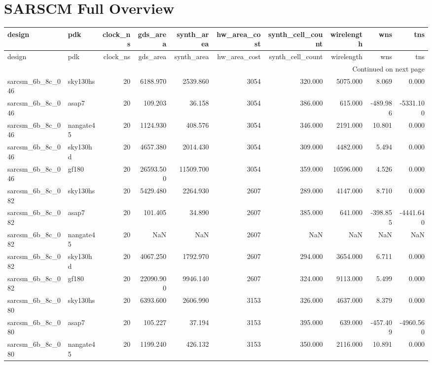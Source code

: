 \documentclass{article}
\begin{document}
\section*{SARSCM Full Overview}
\begin{longtable}{llrrrrrrrr}
\toprule
design & pdk & clock\_ns & gds\_area & synth\_area & hw\_area\_cost & synth\_cell\_count & wirelength & wns & tns \\
\midrule
\endfirsthead
\toprule
design & pdk & clock\_ns & gds\_area & synth\_area & hw\_area\_cost & synth\_cell\_count & wirelength & wns & tns \\
\midrule
\endhead
\midrule
\multicolumn{10}{r}{Continued on next page} \\
\midrule
\endfoot
\bottomrule
\endlastfoot
sarcsm\_6b\_8c\_046 & sky130hs & 20 & 6188.970 & 2539.860 & 3054 & 320.000 & 5075.000 & 8.069 & 0.000 \\
sarcsm\_6b\_8c\_046 & asap7 & 20 & 109.203 & 36.158 & 3054 & 386.000 & 615.000 & -489.986 & -5331.100 \\
sarcsm\_6b\_8c\_046 & nangate45 & 20 & 1124.930 & 408.576 & 3054 & 346.000 & 2191.000 & 10.801 & 0.000 \\
sarcsm\_6b\_8c\_046 & sky130hd & 20 & 4657.380 & 2014.430 & 3054 & 309.000 & 4482.000 & 5.494 & 0.000 \\
sarcsm\_6b\_8c\_046 & gf180 & 20 & 26593.500 & 11509.700 & 3054 & 359.000 & 10596.000 & 4.526 & 0.000 \\
sarcsm\_6b\_8c\_082 & sky130hs & 20 & 5429.480 & 2264.930 & 2607 & 289.000 & 4147.000 & 8.710 & 0.000 \\
sarcsm\_6b\_8c\_082 & asap7 & 20 & 101.405 & 34.890 & 2607 & 385.000 & 641.000 & -398.855 & -4441.640 \\
sarcsm\_6b\_8c\_082 & nangate45 & 20 & NaN & NaN & 2607 & NaN & NaN & NaN & NaN \\
sarcsm\_6b\_8c\_082 & sky130hd & 20 & 4067.250 & 1792.970 & 2607 & 294.000 & 3654.000 & 6.711 & 0.000 \\
sarcsm\_6b\_8c\_082 & gf180 & 20 & 22090.900 & 9946.140 & 2607 & 324.000 & 9113.000 & 5.499 & 0.000 \\
sarcsm\_6b\_8c\_080 & sky130hs & 20 & 6393.600 & 2606.990 & 3153 & 326.000 & 4637.000 & 8.379 & 0.000 \\
sarcsm\_6b\_8c\_080 & asap7 & 20 & 105.227 & 37.194 & 3153 & 395.000 & 639.000 & -457.409 & -4960.560 \\
sarcsm\_6b\_8c\_080 & nangate45 & 20 & 1199.240 & 426.132 & 3153 & 350.000 & 2116.000 & 10.891 & 0.000 \\

\end{longtable}
\end{document}
